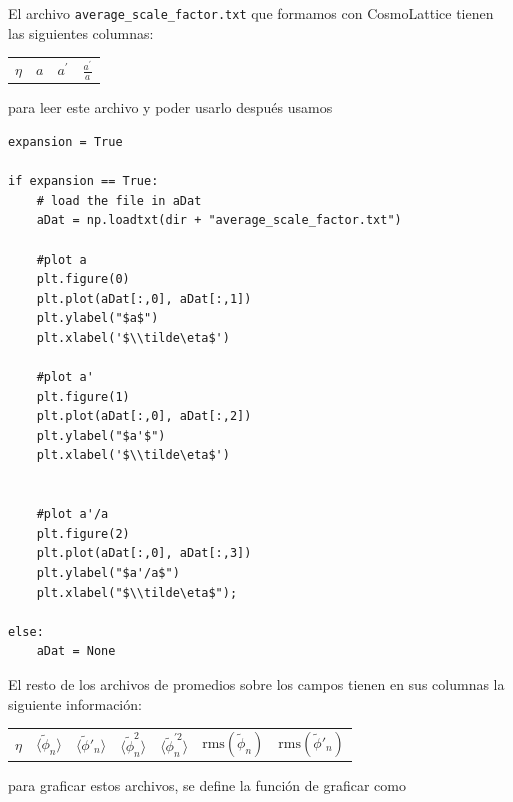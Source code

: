 El archivo \texttt{average\_scale\_factor.txt} que formamos con CosmoLattice tienen las siguientes columnas: 

\begin{center}
    \begin{tabular}{|c|c|c|c|}
        $\eta$ & $a$ & $a^\prime$ & $\displaystyle \frac{a^\prime}{a}$  \\
    \end{tabular}
\end{center}

\noindent
para leer este archivo y poder usarlo después usamos

\begin{lstlisting}[style = pythonStyle]
expansion = True

if expansion == True:
    # load the file in aDat
    aDat = np.loadtxt(dir + "average_scale_factor.txt")
    
    #plot a
    plt.figure(0)
    plt.plot(aDat[:,0], aDat[:,1])
    plt.ylabel("$a$")
    plt.xlabel('$\\tilde\eta$')
    
    #plot a'
    plt.figure(1)
    plt.plot(aDat[:,0], aDat[:,2])
    plt.ylabel("$a'$")
    plt.xlabel('$\\tilde\eta$')
    
    
    #plot a'/a
    plt.figure(2)
    plt.plot(aDat[:,0], aDat[:,3])
    plt.ylabel("$a'/a$")
    plt.xlabel("$\\tilde\eta$");

else:
    aDat = None
\end{lstlisting}

El resto de los archivos de promedios sobre los campos tienen en sus columnas la siguiente información:

\begin{center}
    \begin{tabular}{|c|c|c|c|c|c|c|}
        $\eta$ & $\langle \tilde\phi_n \rangle$ & $\langle \tilde\phi'_n \rangle$ & $\langle \tilde\phi^2_n \rangle$ & $\langle \tilde\phi^{'2}_n \rangle$ & $\mathrm{rms}(\tilde\phi_n) $ & $\mathrm{rms}(\tilde\phi'_n) $
    \end{tabular}
\end{center}

\noindent
para graficar estos archivos, se define la función de graficar como

